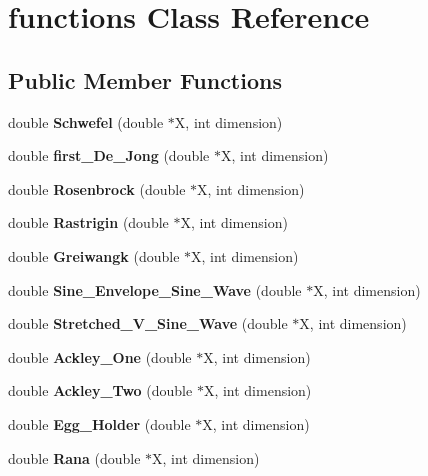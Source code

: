 \section{functions Class Reference}
\label{classfunctions}
\subsection*{Public Member Functions}
\begin{DoxyCompactItemize}
\item 
\mbox{\label{classfunctions_a59d4f9b51d03aff9430f007b8f893b5f}} 
double {\bfseries Schwefel} (double $\ast$X, int dimension)
\item 
\mbox{\label{classfunctions_a6ddf75354f9ca0010c9ddea19ca92de3}} 
double {\bfseries first\+\_\+\+De\+\_\+\+Jong} (double $\ast$X, int dimension)
\item 
\mbox{\label{classfunctions_a5ab758a8c38bd1534ac4707aacbd2419}} 
double {\bfseries Rosenbrock} (double $\ast$X, int dimension)
\item 
\mbox{\label{classfunctions_a4983edb28661e12819504c2581864a82}} 
double {\bfseries Rastrigin} (double $\ast$X, int dimension)
\item 
\mbox{\label{classfunctions_a4c96efc6ecea54ef50afb0e573b3a625}} 
double {\bfseries Greiwangk} (double $\ast$X, int dimension)
\item 
\mbox{\label{classfunctions_ae2733cb192999167dd71011f7dc78cb9}} 
double {\bfseries Sine\+\_\+\+Envelope\+\_\+\+Sine\+\_\+\+Wave} (double $\ast$X, int dimension)
\item 
\mbox{\label{classfunctions_a81c44d882b949246a234559de5ab5860}} 
double {\bfseries Stretched\+\_\+\+V\+\_\+\+Sine\+\_\+\+Wave} (double $\ast$X, int dimension)
\item 
\mbox{\label{classfunctions_ad3c2ad5a58d1adaaf1ddacf914df5dd6}} 
double {\bfseries Ackley\+\_\+\+One} (double $\ast$X, int dimension)
\item 
\mbox{\label{classfunctions_adc0ac2a3c4080ecc88c1ce0bbc584e0d}} 
double {\bfseries Ackley\+\_\+\+Two} (double $\ast$X, int dimension)
\item 
\mbox{\label{classfunctions_a06208d08c50e349055f108fb8b242a01}} 
double {\bfseries Egg\+\_\+\+Holder} (double $\ast$X, int dimension)
\item 
\mbox{\label{classfunctions_a6c22442b3fa26f6b1f6d9d23ae6102f4}} 
double {\bfseries Rana} (double $\ast$X, int dimension)
\item 
\mbox{\label{classfunctions_aa7c71412ee8deae79bad9dcc0a098b15}} 

\end{DoxyCompactItemize}
